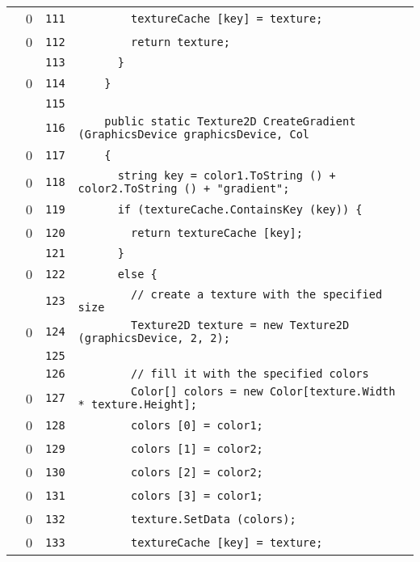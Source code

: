 \documentclass[a4paper,10pt]{article}
\begin{document}
\begin{longtable}[l]{lrrl}
\cellcolor{red} & 0 & \verb~111~ & \verb~        textureCache [key] = texture;~\\
\cellcolor{red} & 0 & \verb~112~ & \verb~        return texture;~\\
\cellcolor{gray} &  & \verb~113~ & \verb~      }~\\
\cellcolor{red} & 0 & \verb~114~ & \verb~    }~\\
\cellcolor{gray} &  & \verb~115~ & \verb~~\\
\cellcolor{gray} &  & \verb~116~ & \verb~    public static Texture2D CreateGradient (GraphicsDevice graphicsDevice, Col~\\
\cellcolor{red} & 0 & \verb~117~ & \verb~    {~\\
\cellcolor{red} & 0 & \verb~118~ & \verb~      string key = color1.ToString () + color2.ToString () + "gradient";~\\
\cellcolor{red} & 0 & \verb~119~ & \verb~      if (textureCache.ContainsKey (key)) {~\\
\cellcolor{red} & 0 & \verb~120~ & \verb~        return textureCache [key];~\\
\cellcolor{gray} &  & \verb~121~ & \verb~      }~\\
\cellcolor{red} & 0 & \verb~122~ & \verb~      else {~\\
\cellcolor{gray} &  & \verb~123~ & \verb~        // create a texture with the specified size~\\
\cellcolor{red} & 0 & \verb~124~ & \verb~        Texture2D texture = new Texture2D (graphicsDevice, 2, 2);~\\
\cellcolor{gray} &  & \verb~125~ & \verb~~\\
\cellcolor{gray} &  & \verb~126~ & \verb~        // fill it with the specified colors~\\
\cellcolor{red} & 0 & \verb~127~ & \verb~        Color[] colors = new Color[texture.Width * texture.Height];~\\
\cellcolor{red} & 0 & \verb~128~ & \verb~        colors [0] = color1;~\\
\cellcolor{red} & 0 & \verb~129~ & \verb~        colors [1] = color2;~\\
\cellcolor{red} & 0 & \verb~130~ & \verb~        colors [2] = color2;~\\
\cellcolor{red} & 0 & \verb~131~ & \verb~        colors [3] = color1;~\\
\cellcolor{red} & 0 & \verb~132~ & \verb~        texture.SetData (colors);~\\
\cellcolor{red} & 0 & \verb~133~ & \verb~        textureCache [key] = texture;~\\

\end{longtable}
\end{document}
